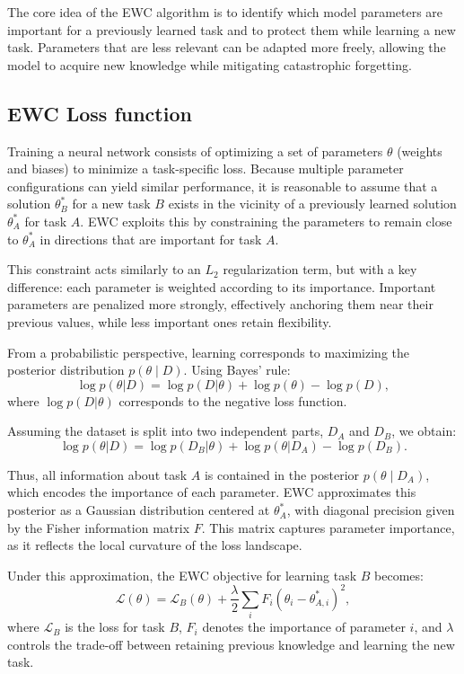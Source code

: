 \documentclass[11pt]{article}
\begin{document}
The core idea of the EWC algorithm is to identify which model parameters are important for a previously learned task and to protect them while learning a new task. Parameters that are less relevant can be adapted more freely, allowing the model to acquire new knowledge while mitigating catastrophic forgetting.

\subsection{EWC Loss function}
Training a neural network consists of optimizing a set of parameters $\theta$ (weights and biases) to minimize a task-specific loss. Because multiple parameter configurations can yield similar performance, it is reasonable to assume that a solution $\theta_B^*$ for a new task $B$ exists in the vicinity of a previously learned solution $\theta_A^*$ for task $A$. EWC exploits this by constraining the parameters to remain close to $\theta_A^*$ in directions that are important for task $A$.

This constraint acts similarly to an $L_2$ regularization term, but with a key difference: each parameter is weighted according to its importance. Important parameters are penalized more strongly, effectively anchoring them near their previous values, while less important ones retain flexibility.

From a probabilistic perspective, learning corresponds to maximizing the posterior distribution $p(\theta \mid D)$. Using Bayes’ rule:
\begin{equation}
\log p(\theta|D) = \log p(D|\theta) + \log p(\theta) - \log p(D),
\end{equation}
where $\log p(D|\theta)$ corresponds to the negative loss function.

Assuming the dataset is split into two independent parts, $D_A$ and $D_B$, we obtain:
\begin{equation}
\log p(\theta|D) = \log p(D_B|\theta) + \log p(\theta|D_A) - \log p(D_B).
\end{equation}

Thus, all information about task $A$ is contained in the posterior $p(\theta \mid D_A)$, which encodes the importance of each parameter. EWC approximates this posterior as a Gaussian distribution centered at $\theta_A^*$, with diagonal precision given by the Fisher information matrix $F$. This matrix captures parameter importance, as it reflects the local curvature of the loss landscape.

Under this approximation, the EWC objective for learning task $B$ becomes:
\begin{equation}
\mathcal{L}(\theta) = \mathcal{L}_B(\theta) + \frac{\lambda}{2} \sum_i F_i (\theta_i - \theta_{A,i}^*)^2,
\end{equation}
where $\mathcal{L}_B$ is the loss for task $B$, $F_i$ denotes the importance of parameter $i$, and $\lambda$ controls the trade-off between retaining previous knowledge and learning the new task.
\end{document}
